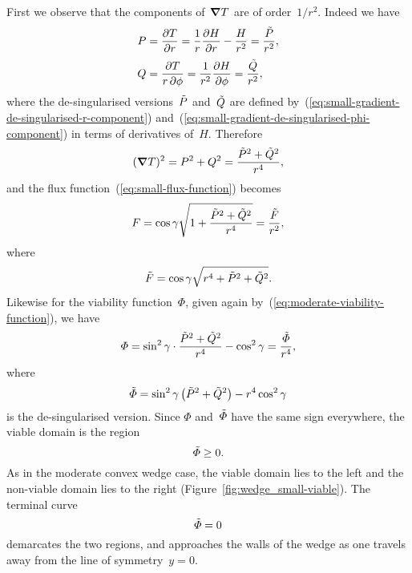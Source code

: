 First we observe that the components of~$\mathop{}\!\boldsymbol{\mathbf{\nabla}} T$ are of order~$1 / r^2$.
Indeed we have
\begin{align}
  P &= \pder{T}{r}
    = \frac{1}{r} \pder{H}{r} - \frac{H}{r^2}
    = \frac{\desing{P}}{r^2},
      \label{eq:small-gradient-r-component} \\[\tallspace]
  Q &= \frac{\pd T}{r \pd\phi}
    = \frac{1}{r^2} \pder{H}{\phi}
    = \frac{\desing{Q}}{r^2},
      \label{eq:small-gradient-phi-component}
\end{align}
where the de-singularised versions~$\tilde{P}$ and~$\tilde{Q}$
are defined by~(\ref{eq:small-gradient-de-singularised-r-component})
and~(\ref{eq:small-gradient-de-singularised-phi-component})
in terms of derivatives of~$H$.
Therefore
\begin{equation}
  (\mathop{}\!\boldsymbol{\mathbf{\nabla}} T)^2
    = P^2 + Q^2
    = \frac{\tilde{P}^2 + \tilde{Q}^2}{r^4},
  \label{eq:small-gradient-squared}
\end{equation}
and the flux function~(\ref{eq:small-flux-function}) becomes
\begin{equation}
  F
    =
      \cos\gamma
      \sqrt{1 + \frac{\tilde{P}^2 + \tilde{Q}^2}{r^4}}
    =
      \frac{\tilde{F}}{r^2},
    \label{eq:small-flux-function-singular}
\end{equation}
where
\begin{equation}
  \tilde{F} = \cos\gamma \sqrt{r^4 + \tilde{P}^2 + \tilde{Q}^2}.
  \label{eq:small-flux-function-de-singularised}
\end{equation}
Likewise for the viability function~$\Phi$,
given again by~(\ref{eq:moderate-viability-function}),
we have
\begin{equation}
  \varPhi
    =
      \sin^2\gamma \cdot \frac{\tilde{P}^2 + \tilde{Q}^2}{r^4}
      - \cos^2\gamma
    =
      \frac{\tilde{\varPhi}}{r^4},
    \label{eq:small-viability-function-singular}
\end{equation}
where
\begin{equation}
  \desing{\Phi} =
    \sin^2\gamma \, \roundbr*{\desing{P}^2 + \desing{Q}^2} - r^4 \cos^2\gamma
  \label{eq:small-viability-function-de-singularised}
\end{equation}
is the de-singularised version.
Since $\Phi$ and~$\tilde{\varPhi}$ have the same sign everywhere,
the viable domain is the region
\begin{equation}
  \tilde{\varPhi} \ge 0.
  \label{eq:small-viable-domain}
\end{equation}
As in the moderate convex wedge case,
the viable domain lies to the left
and the non-viable domain lies to the right
(Figure~\ref{fig:wedge_small-viable}).
The terminal curve
\begin{equation}
  \tilde{\varPhi} = 0
  \label{eq:small-terminal-curve}
\end{equation}
demarcates the two regions,
and approaches the walls of the wedge
as one travels away from the line of symmetry~$y = 0$.

